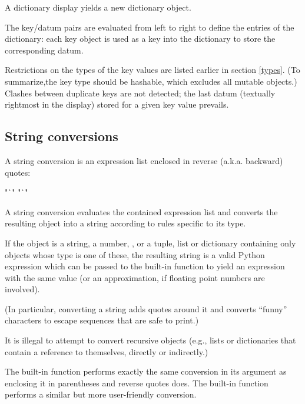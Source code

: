 A dictionary display yields a new dictionary object.

The key/datum pairs are evaluated from left to right to define the
entries of the dictionary: each key object is used as a key into the
dictionary to store the corresponding datum.

Restrictions on the types of the key values are listed earlier in
section \ref{types}.  (To summarize,the key type should be hashable,
which excludes all mutable objects.)  Clashes between duplicate keys
are not detected; the last datum (textually rightmost in the display)
stored for a given key value prevails.


\subsection{String conversions\label{string-conversions}}

A string conversion is an expression list enclosed in reverse (a.k.a.
backward) quotes:

\begin{productionlist}
             {"`"  "`"}
\end{productionlist}

A string conversion evaluates the contained expression list and
converts the resulting object into a string according to rules
specific to its type.

If the object is a string, a number, , or a tuple, list or
dictionary containing only objects whose type is one of these, the
resulting string is a valid Python expression which can be passed to
the built-in function  to yield an expression with the
same value (or an approximation, if floating point numbers are
involved).

(In particular, converting a string adds quotes around it and converts
``funny'' characters to escape sequences that are safe to print.)

It is illegal to attempt to convert recursive objects (e.g., lists or
dictionaries that contain a reference to themselves, directly or
indirectly.)

The built-in function  performs exactly the same
conversion in its argument as enclosing it in parentheses and reverse
quotes does.  The built-in function  performs a
similar but more user-friendly conversion.


